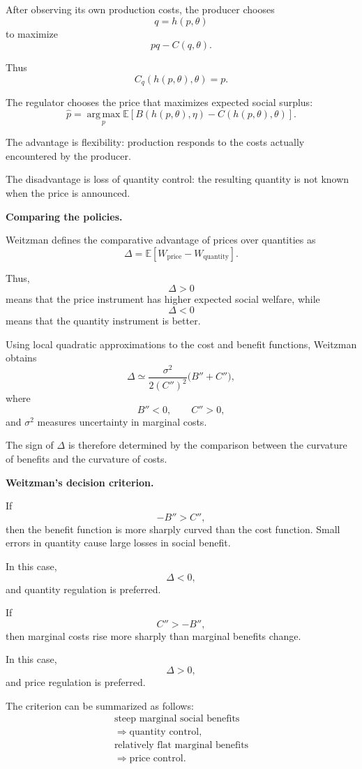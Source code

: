 After observing its own production costs,
the producer chooses
\[
  q=h(p,\theta)
\]
to maximize
\[
  pq-C(q,\theta).
\]

Thus
\[
  C_q(h(p,\theta),\theta)=p.
\]

The regulator chooses the price that
maximizes expected social surplus:
\[
  \widehat p
  =
  \operatorname*{arg\,max}_{p}
  \mathbb{E}
  \left[
    B(h(p,\theta),\eta)
    -
    C(h(p,\theta),\theta)
  \right].
\]

The advantage is flexibility: production
responds to the costs actually encountered
by the producer.

The disadvantage is loss of quantity
control: the resulting quantity is not
known when the price is announced.

\medskip\noindent
{\bf Comparing the policies.}

Weitzman defines the comparative advantage
of prices over quantities as
\[
  \Delta
  =
  \mathbb{E}
  \left[
    W_{\mathrm{price}}
    -
    W_{\mathrm{quantity}}
  \right].
\]

Thus,
\[
  \Delta>0
\]
means that the price instrument has higher
expected social welfare, while
\[
  \Delta<0
\]
means that the quantity instrument is
better.

Using local quadratic approximations to
the cost and benefit functions, Weitzman
obtains
\[
  \Delta
  \simeq
  \frac{\sigma^2}{2(C'')^2}
  \bigl(B''+C''\bigr),
\]
where
\[
  B''<0,
  \qquad
  C''>0,
\]
and $\sigma^2$ measures uncertainty in
marginal costs.

The sign of $\Delta$ is therefore determined
by the comparison between the curvature of
benefits and the curvature of costs.

\medskip\noindent
{\bf Weitzman's decision criterion.}

If
\[
  -B''>C'',
\]
then the benefit function is more sharply
curved than the cost function. Small errors
in quantity cause large losses in social
benefit.

In this case,
\[
  \Delta<0,
\]
and quantity regulation is preferred.

If
\[
  C''>-B'',
\]
then marginal costs rise more sharply than
marginal benefits change.

In this case,
\[
  \Delta>0,
\]
and price regulation is preferred.

The criterion can be summarized as follows:
\[
  \boxed{
  \begin{array}{c}
  \text{steep marginal social benefits}
  \\[2mm]
  \Longrightarrow
  \text{quantity control},
  \\[4mm]
  \text{relatively flat marginal benefits}
  \\[2mm]
  \Longrightarrow
  \text{price control}.
  \end{array}}
\]

